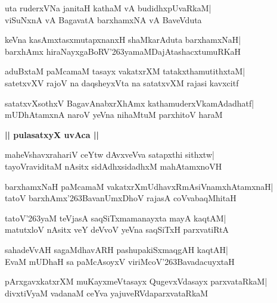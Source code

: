 \documentclass[twoside,12pt,openright]{book}
\def\S{\char'263}
\newcounter{shloka}[chapter]
\def\uvaca#1{\centerline{{\large\textbf{#1}}}}
\begin{document}
\begin{shloka}%
uta ruderxVNa janitaH kathaM vA budidhxpUvaRkaM|\\
viSuNxnA vA BagavatA barxhamxNA vA BaveVduta
\end{shloka}

\begin{shloka}%
keVna kasAmxtasxmutapxnanxH shaMkarAduta barxhamxNaH|\\
barxhAmx hiraNayxgaBoRV\S yamaMDajAtashacxtumuRKaH
\end{shloka}

\begin{shloka}%
aduBxtaM paMcamaM tasayx vakatxrXM tatakxthamutithxtaM|\\
satetxvXV rajoV na daqsheyxVta na satatxvXM rajasi kavxcitf
\end{shloka}

\begin{shloka}%
satatxvXsothxV BagavAnabxrXhAmx kathamuderxVkamAdadhatf|\\
mUDhAtamxnA naroV yeVna nihaMtuM parxhitoV haraM
\end{shloka}

\uvaca{|| pulasatxyX uvAca ||}
\begin{shloka}%
maheVshavxrahariV ceYtw dAvxveVva satapxthi sithxtw|\\
tayoVraviditaM nAsitx sidAdhxsidadhxM mahAtamxnoVH
\end{shloka}

\begin{shloka}%
barxhamxNaH paMcamaM vakatxrXmUdhavxRmAsiVnamxhAtamxnaH|\\
tatoV barxhAmx\S BavanUmxDhoV rajasA coVvabaqMhitaH
\end{shloka}

\begin{shloka}%
tatoV\S yaM teVjasA saqSiTxmamanayxta mayA kaqtAM|\\
matutxloV nAsitx veY deVvoV yeVna saqSiTxH parxvatiRtA
\end{shloka}

\begin{shloka}%
sahadeVvAH sagaMdhavARH pashupakiSxmaqgAH kaqtAH|\\
EvaM mUDhaH sa paMcAsoyxV viriMcoV\S BavadacuyxtaH
\end{shloka}

\begin{shloka}%
pArxgavxkatxrXM muKayxmeVtasayx QugevxVdasayx parxvataRkaM|\\
divxtiVyaM vadanaM ceYva yajuveRVdaparxvataRkaM
\end{shloka}
\end{document}
